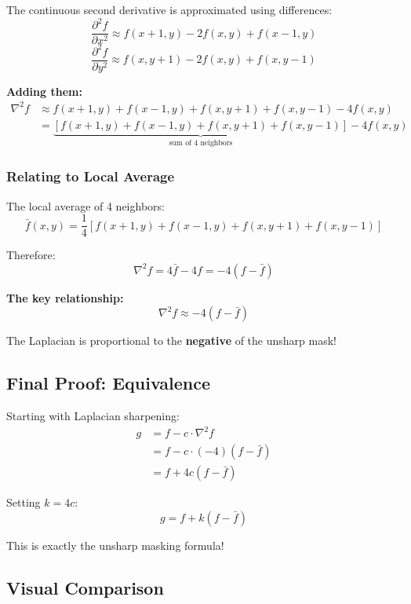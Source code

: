 \documentclass[12pt,a4paper]{article}
\begin{document}
The continuous second derivative is approximated using differences:
\[
\frac{\partial^2 f}{\partial x^2} \approx f(x+1,y) - 2f(x,y) + f(x-1,y)
\]
\[
\frac{\partial^2 f}{\partial y^2} \approx f(x,y+1) - 2f(x,y) + f(x,y-1)
\]

\textbf{Adding them:}
\begin{align*}
\nabla^2 f &\approx f(x+1,y) + f(x-1,y) + f(x,y+1) + f(x,y-1) - 4f(x,y) \\[0.5em]
&= \underbrace{[f(x+1,y) + f(x-1,y) + f(x,y+1) + f(x,y-1)]}_{\text{sum of 4 neighbors}} - 4f(x,y)
\end{align*}

\subsubsection{Relating to Local Average}

The local average of 4 neighbors:
\[
\bar{f}(x,y) = \frac{1}{4}[f(x+1,y) + f(x-1,y) + f(x,y+1) + f(x,y-1)]
\]

Therefore:
\[
\nabla^2 f = 4\bar{f} - 4f = -4(f - \bar{f})
\]

\begin{keypoint}
\textbf{The key relationship:}
\[
\boxed{\nabla^2 f \approx -4(f - \bar{f})}
\]

The Laplacian is proportional to the \textbf{negative} of the unsharp mask!
\end{keypoint}

\subsection{Final Proof: Equivalence}

Starting with Laplacian sharpening:
\begin{align*}
g &= f - c \cdot \nabla^2 f \\[0.5em]
&= f - c \cdot (-4)(f - \bar{f}) \\[0.5em]
&= f + 4c(f - \bar{f})
\end{align*}

Setting $k = 4c$:
\[
\boxed{g = f + k(f - \bar{f})}
\]

This is exactly the unsharp masking formula!

\subsection{Visual Comparison}
\end{document}
